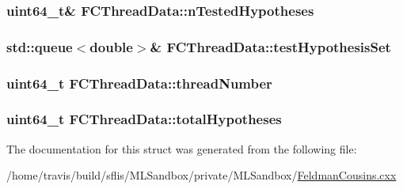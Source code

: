 \hypertarget{structFCThreadData_ab907b43fdcbc5b14b65cd2ca79306806}{
\subsubsection[{n\-Tested\-Hypotheses}]{\setlength{\rightskip}{0pt plus 5cm}uint64\-\_\-t\& F\-C\-Thread\-Data\-::n\-Tested\-Hypotheses}}\label{structFCThreadData_ab907b43fdcbc5b14b65cd2ca79306806}
\hypertarget{structFCThreadData_a74bbf1a21613e4c77e011a14c1f26c6a}{
\subsubsection[{test\-Hypothesis\-Set}]{\setlength{\rightskip}{0pt plus 5cm}std\-::queue$<$double$>$\& F\-C\-Thread\-Data\-::test\-Hypothesis\-Set}}\label{structFCThreadData_a74bbf1a21613e4c77e011a14c1f26c6a}
\hypertarget{structFCThreadData_aff011a8ec29fb8962da9474440525374}{
\subsubsection[{thread\-Number}]{\setlength{\rightskip}{0pt plus 5cm}uint64\-\_\-t F\-C\-Thread\-Data\-::thread\-Number}}\label{structFCThreadData_aff011a8ec29fb8962da9474440525374}
\hypertarget{structFCThreadData_a7243be9f8ba86b1a9f3e6a24b69adfb2}{
\subsubsection[{total\-Hypotheses}]{\setlength{\rightskip}{0pt plus 5cm}uint64\-\_\-t F\-C\-Thread\-Data\-::total\-Hypotheses}}\label{structFCThreadData_a7243be9f8ba86b1a9f3e6a24b69adfb2}


The documentation for this struct was generated from the following file\-:\begin{DoxyCompactItemize}
\item 
/home/travis/build/sflis/\-M\-L\-Sandbox/private/\-M\-L\-Sandbox/\hyperlink{MLSandbox_2FeldmanCousins_8cxx}{Feldman\-Cousins.\-cxx}\end{DoxyCompactItemize}
